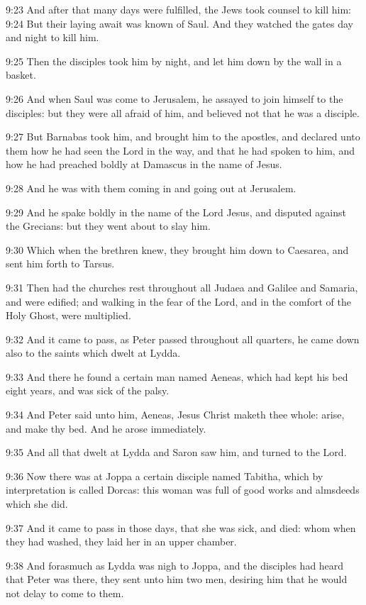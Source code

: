 9:23 And after that many days were fulfilled, the Jews took counsel to
kill him: 9:24 But their laying await was known of Saul. And they
watched the gates day and night to kill him.

9:25 Then the disciples took him by night, and let him down by the
wall in a basket.

9:26 And when Saul was come to Jerusalem, he assayed to join himself
to the disciples: but they were all afraid of him, and believed not
that he was a disciple.

9:27 But Barnabas took him, and brought him to the apostles, and
declared unto them how he had seen the Lord in the way, and that he
had spoken to him, and how he had preached boldly at Damascus in the
name of Jesus.

9:28 And he was with them coming in and going out at Jerusalem.

9:29 And he spake boldly in the name of the Lord Jesus, and disputed
against the Grecians: but they went about to slay him.

9:30 Which when the brethren knew, they brought him down to Caesarea,
and sent him forth to Tarsus.

9:31 Then had the churches rest throughout all Judaea and Galilee and
Samaria, and were edified; and walking in the fear of the Lord, and in
the comfort of the Holy Ghost, were multiplied.

9:32 And it came to pass, as Peter passed throughout all quarters, he
came down also to the saints which dwelt at Lydda.

9:33 And there he found a certain man named Aeneas, which had kept his
bed eight years, and was sick of the palsy.

9:34 And Peter said unto him, Aeneas, Jesus Christ maketh thee whole:
arise, and make thy bed. And he arose immediately.

9:35 And all that dwelt at Lydda and Saron saw him, and turned to the
Lord.

9:36 Now there was at Joppa a certain disciple named Tabitha, which by
interpretation is called Dorcas: this woman was full of good works and
almsdeeds which she did.

9:37 And it came to pass in those days, that she was sick, and died:
whom when they had washed, they laid her in an upper chamber.

9:38 And forasmuch as Lydda was nigh to Joppa, and the disciples had
heard that Peter was there, they sent unto him two men, desiring him
that he would not delay to come to them.

